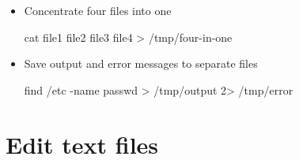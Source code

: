 \begin{itemize}
\item Concentrate four files into one
\begin{commandshell}
cat file1 file2 file3 file4 > /tmp/four-in-one
\end{commandshell}

\item Save output and error messages to separate files
\begin{commandshell}
find /etc -name passwd > /tmp/output 2> /tmp/error
\end{commandshell}

\end{itemize}

\section{Edit text files}